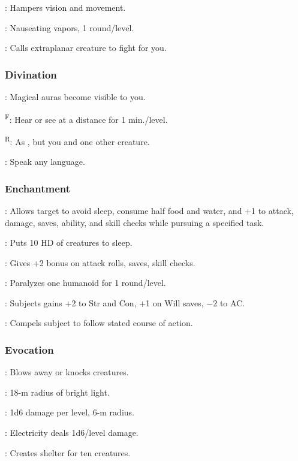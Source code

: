 	: Hampers vision and movement.

	: Nauseating vapors, 1 round/level.

	: Calls extraplanar creature to fight for you.

\subsubsection{Divination}
	: Magical auras become visible to you.

	\textsuperscript{F}: Hear or see at a distance for 1 min./level.

	\textsuperscript{R}: As , but you and one other creature.

	: Speak any language.

\subsubsection{Enchantment}
	: Allows target to avoid sleep, consume half food and water, and +1 to attack, damage, saves, ability, and skill checks while pursuing a specified task. %

	: Puts 10 HD of creatures to sleep.

	: Gives +2 bonus on attack rolls, saves, skill checks.

	: Paralyzes one humanoid for 1 round/level.

	: Subjects gains +2 to Str and Con, +1 on Will saves, $-2$ to AC.

	: Compels subject to follow stated course of action.

\subsubsection{Evocation}
	: Blows away or knocks creatures.

	: 18-m radius of bright light.

	: 1d6 damage per level, 6-m radius.

	: Electricity deals 1d6/level damage.

	: Creates shelter for ten creatures.

